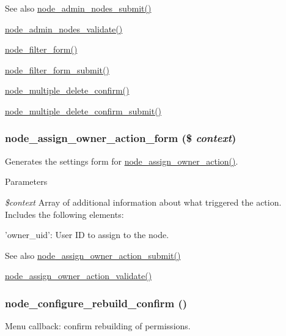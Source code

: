 \begin{DoxySeeAlso}{See also}
\hyperlink{node_8admin_8inc_a5f159cfed0d6cce65d5d70747efec391}{node\_\-admin\_\-nodes\_\-submit()} 

\hyperlink{node_8admin_8inc_a32a9ea91250aaf84de44f784a3569944}{node\_\-admin\_\-nodes\_\-validate()} 

\hyperlink{group__forms_ga2b7edb82b488db11ffde4fa60958004d}{node\_\-filter\_\-form()} 

\hyperlink{node_8admin_8inc_a346f00ebb9b4aae36025623d893c5061}{node\_\-filter\_\-form\_\-submit()} 

\hyperlink{group__forms_ga25cc06a5aa3aa17eadc5a8a97e7c5e9e}{node\_\-multiple\_\-delete\_\-confirm()} 

\hyperlink{node_8admin_8inc_ab8a2e11edeef2797ca739f94d1eb1af9}{node\_\-multiple\_\-delete\_\-confirm\_\-submit()} 
\end{DoxySeeAlso}
\hypertarget{group__forms_ga427eee96a0ab2c2048a39fafcb6c4173}{
\subsubsection[{node\_\-assign\_\-owner\_\-action\_\-form}]{\setlength{\rightskip}{0pt plus 5cm}node\_\-assign\_\-owner\_\-action\_\-form (\$ {\em context})}}
\label{group__forms_ga427eee96a0ab2c2048a39fafcb6c4173}
Generates the settings form for \hyperlink{group__actions_ga35a1ee4e6845f1031ef84ef787252efd}{node\_\-assign\_\-owner\_\-action()}.


\begin{DoxyParams}{Parameters}
\item[{\em \$context}]Array of additional information about what triggered the action. Includes the following elements:
\begin{DoxyItemize}
\item 'owner\_\-uid': User ID to assign to the node.
\end{DoxyItemize}\end{DoxyParams}
\begin{DoxySeeAlso}{See also}
\hyperlink{node_8module_a777bb331cf28f580e2a3030d95d9f254}{node\_\-assign\_\-owner\_\-action\_\-submit()} 

\hyperlink{node_8module_a85a0ccfdb35dae02fed98ec3c3498c85}{node\_\-assign\_\-owner\_\-action\_\-validate()} 
\end{DoxySeeAlso}
\hypertarget{group__forms_ga650b907eb478b9c293e4b93e3ecb560d}{
\subsubsection[{node\_\-configure\_\-rebuild\_\-confirm}]{\setlength{\rightskip}{0pt plus 5cm}node\_\-configure\_\-rebuild\_\-confirm ()}}
\label{group__forms_ga650b907eb478b9c293e4b93e3ecb560d}
Menu callback: confirm rebuilding of permissions.

